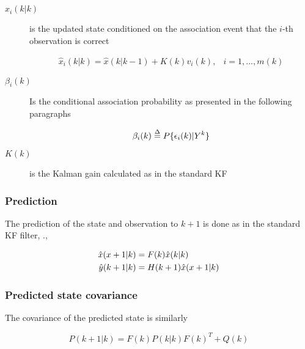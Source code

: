 \begin{description}
	\item[$ \hat{x}_i(k|k) $ ] is the updated state conditioned on the association event that the $i$-th observation is correct
	
	\begin{equation}\label{eq:PDAupdate}
	\begin{array}{ll}
			\hat{x}_i(k|k)= \hat{x}(k|k-1) + K(k)v_i(k), &i=1,...,m(k)
	\end{array}
	\end{equation}
	
	\item[$ \beta_i(k) $] Is the conditional association probability as presented in the following paragraphs
	
	\begin{equation}\label{eq:associationprobability}
	\beta_i(k) 	\overset{\Delta}{=} P\{\epsilon_i(k)|{Y}^k\}
	\end{equation}
	
	\item[$K(k)$] is the Kalman gain calculated as in the standard KF
	
	
\end{description}


\subsubsection{Prediction}

The prediction of the state and observation to $k+1$ is done as in the standard KF filter, \ie.,


\begin{equation}
\begin{aligned}
\hat{x}(x+1|k) &=  F(k)\hat{x}(k|k) \\
{\hat{{y}}}(k+1|k) &= H(k+1)\hat{x}(x+1|k)
\end{aligned}
\end{equation}

\subsubsection{Predicted state covariance}

The covariance of the predicted state is similarly

\begin{equation}
P(k+1|k) = F(k)P(k|k)F(k)^T + Q(k)
\end{equation}




